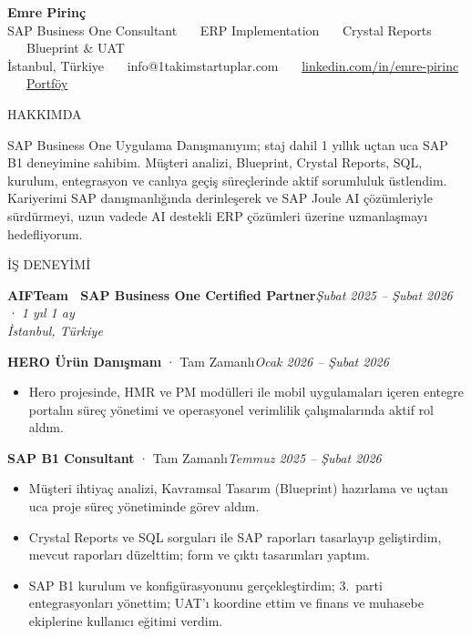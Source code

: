 \documentclass[a4paper,8pt]{extarticle}
\newcommand{\cvsection}[1]{%
  \vspace{4pt}%
  \noindent\colorbox{cvbluelight}{\parbox{\dimexpr\textwidth-2\fboxsep}{\color{cvblue}\bfseries\strut #1\strut}}%
  \par\vspace{2pt}%
}
\begin{document}
\begin{center}
\colorbox{cvblue}{%
  \parbox{\dimexpr\textwidth-2\fboxsep}{%
    \centering
    \color{white}
    \vspace{4pt}
    {\LARGE\bfseries Emre Pirinç}\\[3pt]
    {\small SAP Business One Consultant \ \textbar\ \ ERP Implementation \ \textbar\ \ Crystal Reports \ \textbar\ \ Blueprint \& UAT}\\[3pt]
    {\footnotesize İstanbul, Türkiye \ \textbullet\ \ info@1takimstartuplar.com \ \textbullet\ \ \href{https://linkedin.com/in/emre-pirinc}{\color{white}linkedin.com/in/emre-pirinc} \ \textbullet\ \ \href{https://emrepirinc.github.io}{\color{white}Portföy}}
    \vspace{4pt}
  }%
}
\end{center}

\vspace{2pt}

\cvsection{HAKKIMDA}
{\small SAP Business One Uygulama Danışmanıyım; staj dahil 1 yıllık uçtan uca SAP B1 deneyimine sahibim. Müşteri analizi, Blueprint, Crystal Reports, SQL, kurulum, entegrasyon ve canlıya geçiş süreçlerinde aktif sorumluluk üstlendim. Kariyerimi SAP danışmanlığında derinleşerek ve SAP Joule AI çözümleriyle sürdürmeyi, uzun vadede AI destekli ERP çözümleri üzerine uzmanlaşmayı hedefliyorum.}

\cvsection{İŞ DENEYİMİ}

\textbf{AIFTeam \textbar\ SAP Business One Certified Partner}\hfill{\small\textit{Şubat 2025 -- Şubat 2026 · 1 yıl 1 ay}}\\
{\small\textit{İstanbul, Türkiye}}

\vspace{2pt}
{\small\textbf{HERO Ürün Danışmanı} · Tam Zamanlı\hfill\textit{Ocak 2026 -- Şubat 2026}}
\begin{itemize}
\item {\small Hero projesinde, HMR ve PM modülleri ile mobil uygulamaları içeren entegre portalın süreç yönetimi ve operasyonel verimlilik çalışmalarında aktif rol aldım.}
\end{itemize}

\vspace{2pt}
{\small\textbf{SAP B1 Consultant} · Tam Zamanlı\hfill\textit{Temmuz 2025 -- Şubat 2026}}
\begin{itemize}
\item {\small Müşteri ihtiyaç analizi, Kavramsal Tasarım (Blueprint) hazırlama ve uçtan uca proje süreç yönetiminde görev aldım.}
\item {\small Crystal Reports ve SQL sorguları ile SAP raporları tasarlayıp geliştirdim, mevcut raporları düzelttim; form ve çıktı tasarımları yaptım.}
\item {\small SAP B1 kurulum ve konfigürasyonunu gerçekleştirdim; 3.\ parti entegrasyonları yönettim; UAT'ı koordine ettim ve finans ve muhasebe ekiplerine kullanıcı eğitimi verdim.}
\end{itemize}
\end{document}
